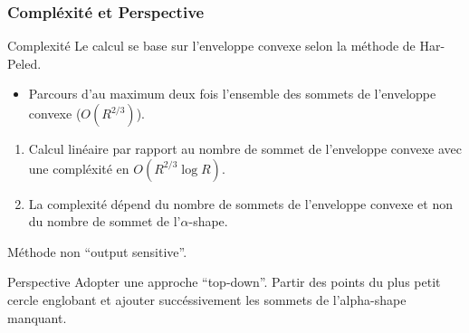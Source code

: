 \begin{frame}
\frametitle{Compléxité et Perspective}

\begin{block}{ Complexité}
  Le calcul se base sur l'enveloppe convexe selon la méthode de Har-Peled. 
  \begin{itemize}
    \item Parcours d'au maximum deux fois l'ensemble des sommets de l'enveloppe convexe ($O(R^{2/3})$). 
  \end{itemize}
  
  \begin{enumerate}
    \item Calcul linéaire par rapport au nombre de sommet de l'enveloppe convexe avec une compléxité en $O(R^{2/3} \log R )$.
    \item La complexité dépend du nombre de sommets de l'enveloppe convexe et non du nombre de sommet de l'$\alpha$-shape.\\
  \end{enumerate}
  \alert{Méthode non ``output sensitive''.} 
\end{block}

\begin{block}{Perspective}
  Adopter une approche ``top-down''. 
  Partir des points du plus petit cercle englobant et ajouter succéssivement les sommets de l'alpha-shape manquant. 
\end{block}
\end{frame}


